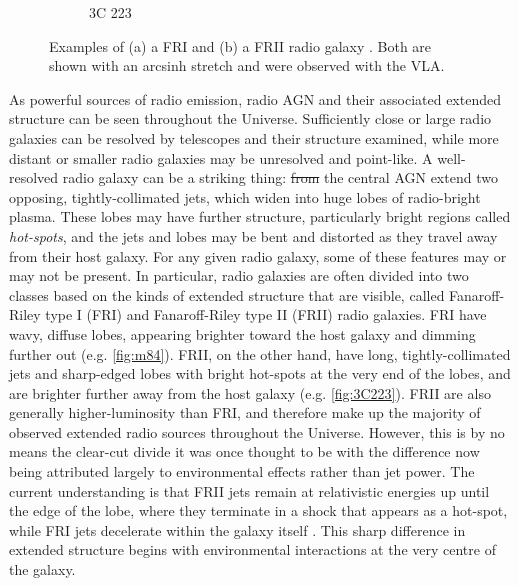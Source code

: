 \documentclass[11pt, a4paper]{book}
\newcommand{\defn}[1]{\emph{#1}}
\providecommand{\DIFaddtex}[1]{{\protect\color{blue}\uwave{#1}}} %
\providecommand{\DIFdeltex}[1]{{\protect\color{red}\sout{#1}}}                      %
\providecommand{\DIFaddbegin}{} %
\providecommand{\DIFaddend}{} %
\providecommand{\DIFdelbegin}{} %
\providecommand{\DIFdelend}{} %
\providecommand{\DIFadd}[1]{\texorpdfstring{\DIFaddtex{#1}}{#1}} %
\providecommand{\DIFdel}[1]{\texorpdfstring{\DIFdeltex{#1}}{}} %
\newcommand{\DIFscaledelfig}{0.5}
\newlength{\DIFdelgraphicswidth} %
\newlength{\DIFdelgraphicsheight} %
\newcommand{\DIFaddincludegraphics}[2][]{{\color{blue}\fbox{\DIFOincludegraphics[#1]{#2}}}} %
\newcommand{\DIFdelincludegraphics}[2][]{%
\sbox{\DIFdelgraphicsbox}{\DIFOincludegraphics[#1]{#2}}%
\settoboxwidth{\DIFdelgraphicswidth}{\DIFdelgraphicsbox} %
\settoboxtotalheight{\DIFdelgraphicsheight}{\DIFdelgraphicsbox} %
\scalebox{\DIFscaledelfig}{%
\parbox[b]{\DIFdelgraphicswidth}{\usebox{\DIFdelgraphicsbox}\\[-\baselineskip] \rule{\DIFdelgraphicswidth}{0em}}\llap{\resizebox{\DIFdelgraphicswidth}{\DIFdelgraphicsheight}{%
\setlength{\unitlength}{\DIFdelgraphicswidth}%
\begin{picture}(1,1)%
\thicklines\linethickness{2pt} %
{\color[rgb]{1,0,0}\put(0,0){\framebox(1,1){}}}%
{\color[rgb]{1,0,0}\put(0,0){\line( 1,1){1}}}%
{\color[rgb]{1,0,0}\put(0,1){\line(1,-1){1}}}%
\end{picture}%
}\hspace*{3pt}}} %
} %
\DeclareRobustCommand{\DIFaddbegin}{\DIFOaddbegin \let\includegraphics\DIFaddincludegraphics} %
\DeclareRobustCommand{\DIFaddend}{\DIFOaddend \let\includegraphics\DIFOincludegraphics} %
\DeclareRobustCommand{\DIFdelbegin}{\DIFOdelbegin \let\includegraphics\DIFdelincludegraphics} %
\DeclareRobustCommand{\DIFdelend}{\DIFOaddend \let\includegraphics\DIFOincludegraphics} %
\begin{document}
\begin{figure}
\begin{subfigure}{0.45\textwidth}
                \caption{3C 223}
                \label{fig:3C223}
            \end{subfigure}
            \caption[Examples of a FRI and a FRII radio galaxy.]{\label{fig:fri-frii} Examples of (a) a FRI \citep{laing_rotation_1987} and (b) a FRII radio galaxy \citep{leahy_vla_1991}. Both are shown with an arcsinh stretch and were observed with the VLA.}
        \end{figure}

        As powerful sources of radio emission, radio AGN and their associated extended structure can be seen throughout the Universe. Sufficiently close or large radio galaxies can be resolved by telescopes and their structure examined, while more distant or smaller radio galaxies may be unresolved and point-like. A well-resolved radio galaxy can be a striking thing: \DIFdelbegin \DIFdel{from }\DIFdelend \DIFaddbegin \DIFadd{From }\DIFaddend the central AGN extend two opposing, tightly-collimated jets, which widen into huge lobes of radio-bright plasma. These lobes may have further structure, particularly bright regions called \defn{hot-spots}, and the jets and lobes may be bent and distorted as they travel away from their host galaxy. For any given radio galaxy, some of these features may or may not be present. In particular, radio galaxies are often divided into two classes based on the kinds of extended structure that are visible, called Fanaroff-Riley type I (FRI) and Fanaroff-Riley type II (FRII) radio galaxies. FRI have wavy, diffuse lobes, appearing brighter toward the host galaxy and dimming further out (e.g. \autoref{fig:m84}). FRII, on the other hand, have long, tightly-collimated jets and sharp-edged lobes with bright hot-spots \citep{urry95unified} at the very end of the lobes, and are brighter further away from the host galaxy (e.g. \autoref{fig:3C223}). FRII are also generally higher-luminosity \citep{fanaroff1974} than FRI, and therefore make up the majority of observed extended radio sources throughout the Universe. However, this is by no means the clear-cut divide it was once thought to be \citep{mingo_revisiting_2019} with the difference now being attributed largely to environmental effects rather than jet power. The current understanding is that FRII jets remain at relativistic energies up until the edge of the lobe, where they terminate in a shock that appears as a hot-spot, while FRI jets decelerate within the galaxy itself \citep{hardcastle20feedback}. This sharp difference in extended structure begins with environmental interactions at the very centre of the galaxy.
\end{document}
